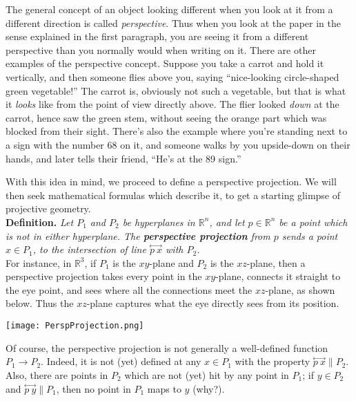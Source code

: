 \documentclass[leqno]{book}
\begin{document}
The general concept of an object looking different when you look at it from a different direction is called \emph{perspective}.  Thus when you look at the paper in the sense explained in the first paragraph, you are seeing it from a different perspective than you normally would when writing on it.  There are other examples of the perspective concept.  Suppose you take a carrot and hold it vertically, and then someone flies above you, saying ``nice-looking circle-shaped green vegetable!''  The carrot is, obviously not such a vegetable, but that is what it \emph{looks} like from the point of view directly above.  The flier looked \emph{down} at the carrot, hence saw the green stem, without seeing the orange part which was blocked from their sight.  There's also the example where you're standing next to a sign with the number 68 on it, and someone walks by you upside-down on their hands, and later tells their friend, ``He's at the 89 sign.''

With this idea in mind, we proceed to define a perspective projection.  We will then seek mathematical formulas which describe it, to get a starting glimpse of projective geometry.\\

\noindent\textbf{Definition.} \emph{Let $P_1$ and $P_2$ be hyperplanes in $\mathbb R^n$, and let $p\in\mathbb R^n$ be a point which is not in either hyperplane.  The \textbf{perspective projection} from $p$ sends a point $x\in P_1$, to the intersection of line $\overset{\longleftrightarrow}{p~x}$ with $P_2$.}\\

\noindent For instance, in $\mathbb R^3$, if $P_1$ is the $xy$-plane and $P_2$ is the $xz$-plane, then a perspective projection takes every point in the $xy$-plane, connects it straight to the eye point, and sees where all the connections meet the $xz$-plane, as shown below.  Thus the $xz$-plane captures what the eye directly sees from its position.
\begin{center}\texttt{[image: PerspProjection.png]}\end{center}
Of course, the perspective projection is not generally a well-defined function $P_1\to P_2$.  Indeed, it is not (yet) defined at any $x\in P_1$ with the property $\overset{\longleftrightarrow}{p~x}\parallel P_2$.  Also, there are points in $P_2$ which are not (yet) hit by any point in $P_1$; if $y\in P_2$ and $\overset{\longleftrightarrow}{p~y}\parallel P_1$, then no point in $P_1$ maps to $y$ (why?).
\end{document}
